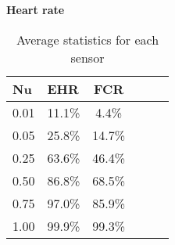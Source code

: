 \begin{table}[h]
  \vspace{4pt}

  \textbf{Heart rate}\vspace{2pt}
  \begin{tabularx}{\columnwidth}{XXcXXc}
    \toprule
    \textbf{Nu} & \textbf{EHR} & \textbf{FCR} \\
    \midrule
    0.01        & 11.1\%       & 4.4\%        \\ \hline
    0.05        & 25.8\%       & 14.7\%       \\ \hline
    0.25        & 63.6\%       & 46.4\%       \\ \hline
    0.50        & 86.8\%       & 68.5\%       \\ \hline
    0.75        & 97.0\%       & 85.9\%       \\ \hline
    1.00        & 99.9\%       & 99.3\%       \\ \hline
   \bottomrule
  \end{tabularx}

  \caption{Average statistics for each sensor}
  \label{[TABLE]_avg_stats_sensors}
\end{table}